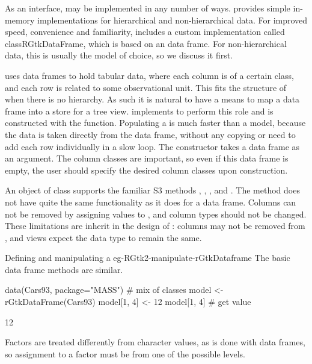 As an interface,  may be implemented in any number
of ways. \GTK\/ provides simple in-memory implementations for
hierarchical and non-hierarchical data. For improved speed,
convenience and familiarity,  includes a custom
 implementation called class{RGtkDataFrame}, which
is based on an \R\/ data frame. For non-hierarchical data, this is
usually the model of choice, so we discuss it first.

\R\/ uses data frames to hold tabular data, where each column is of a
certain class, and each row is related to some observational
unit. This fits the structure of  when there is no
hierarchy. As such it is natural to have a means to map a data frame
into a store for a tree view.  implements
 to perform this role and is constructed with the
 function. Populating a
 is much faster than a \GTK\/ model, because the
data is taken directly from the data frame, without any copying or
need to add each row individually in a slow \R\/ loop. The constructor
takes a data frame as an argument. The column classes are important,
so even if this data frame is empty, the user should specify the
desired column classes upon construction.

An object of class  supports the familiar S3
methods \method{[}{RGtkDataFrame}, \method{[\ASSIGN}{RGtkDataFrame},
, and
. The \code{[$<$-} method does
not have quite the same functionality as it does for a data
frame. Columns can not be removed by assigning values to ,
and column types should not be changed. These limitations are inherit
in the design of \GTK: columns may not be removed from
, and views expect the data type to remain the
same.

\begin{example}{Defining and manipulating a }{eg-RGtk2-manipulate-rGtkDataframe}
  The basic data frame methods are similar.
\begin{Schunk}
\begin{Sinput}
 data(Cars93, package="MASS")            # mix of classes
 model <- rGtkDataFrame(Cars93)
 model[1, 4] <- 12
 model[1, 4]                              # get value
\end{Sinput}
\begin{Soutput}
[1] 12
\end{Soutput}
\end{Schunk}

Factors are treated differently from character values, as is done with
data frames, so assignment to a factor must be from one of the
possible levels.

\end{example}

